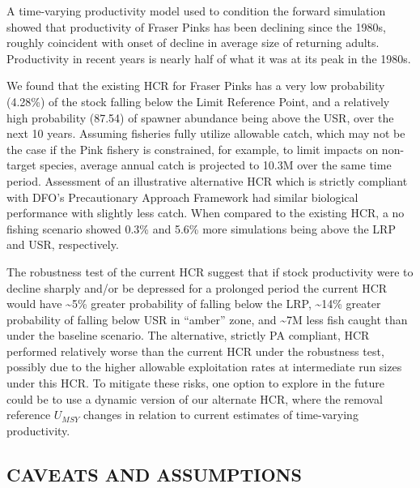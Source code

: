 \documentclass[french,11pt]{book}
\begin{document}
A time-varying productivity model used to condition the forward simulation showed that productivity of Fraser Pinks has been declining since the 1980s, roughly coincident with onset of decline in average size of returning adults. Productivity in recent years is nearly half of what it was at its peak in the 1980s.

We found that the existing HCR for Fraser Pinks has a very low probability (4.28\%) of the stock falling below the Limit Reference Point, and a relatively high probability (87.54) of spawner abundance being above the USR, over the next 10 years. Assuming fisheries fully utilize allowable catch, which may not be the case if the Pink fishery is constrained, for example, to limit impacts on non-target species, average annual catch is projected to 10.3M over the same time period. Assessment of an illustrative alternative HCR which is strictly compliant with DFO's Precautionary Approach Framework had similar biological performance with slightly less catch. When compared to the existing HCR, a no fishing scenario showed 0.3\% and 5.6\% more simulations being above the LRP and USR, respectively.

The robustness test of the current HCR suggest that if stock productivity were to decline sharply and/or be depressed for a prolonged period the current HCR would have \textasciitilde5\% greater probability of falling below the LRP, \textasciitilde14\% greater probability of falling below USR in ``amber'' zone, and \textasciitilde7M less fish caught than under the baseline scenario. The alternative, strictly PA compliant, HCR performed relatively worse than the current HCR under the robustness test, possibly due to the higher allowable exploitation rates at intermediate run sizes under this HCR. To mitigate these risks, one option to explore in the future could be to use a dynamic version of our alternate HCR, where the removal reference \(U_{MSY}\) changes in relation to current estimates of time-varying productivity.

\hypertarget{caveats-and-assumptions}{%
\subsection{CAVEATS AND ASSUMPTIONS}\label{caveats-and-assumptions}}
\end{document}
